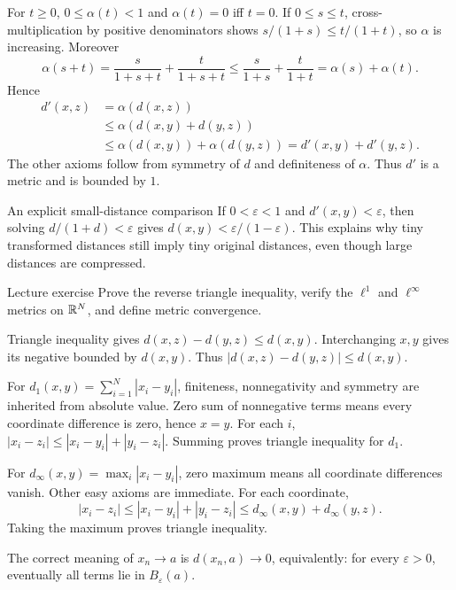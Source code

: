 \begin{answer}
For $t\ge0$, $0\le\alpha(t)<1$ and $\alpha(t)=0$ iff $t=0$. If $0\le s\le t$, cross-multiplication by positive denominators shows $s/(1+s)\le t/(1+t)$, so $\alpha$ is increasing. Moreover
\[\alpha(s+t)=\frac{s}{1+s+t}+\frac{t}{1+s+t}\le\frac{s}{1+s}+\frac{t}{1+t}=\alpha(s)+\alpha(t).\]
Hence
\begin{align*}
d'(x,z)&=\alpha(d(x,z))\\
&\le\alpha(d(x,y)+d(y,z))\\
&\le\alpha(d(x,y))+\alpha(d(y,z))=d'(x,y)+d'(y,z).
\end{align*}
The other axioms follow from symmetry of $d$ and definiteness of $\alpha$. Thus $d'$ is a metric and is bounded by $1$.
\end{answer}
\begin{note}{An explicit small-distance comparison}
If $0<\varepsilon<1$ and $d'(x,y)<\varepsilon$, then solving $d/(1+d)<\varepsilon$ gives $d(x,y)<\varepsilon/(1-\varepsilon)$. This explains why tiny transformed distances still imply tiny original distances, even though large distances are compressed.
\end{note}
\begin{exam}{Lecture exercise}
Prove the reverse triangle inequality, verify the $\ell^1$ and $\ell^\infty$ metrics on $\mathbb R^N$, and define metric convergence.
\end{exam}
\begin{answer}
Triangle inequality gives $d(x,z)-d(y,z)\le d(x,y)$. Interchanging $x,y$ gives its negative bounded by $d(x,y)$. Thus $|d(x,z)-d(y,z)|\le d(x,y)$.

For $d_1(x,y)=\sum_{i=1}^N|x_i-y_i|$, finiteness, nonnegativity and symmetry are inherited from absolute value. Zero sum of nonnegative terms means every coordinate difference is zero, hence $x=y$. For each $i$, $|x_i-z_i|\le|x_i-y_i|+|y_i-z_i|$. Summing proves triangle inequality for $d_1$.

For $d_\infty(x,y)=\max_i|x_i-y_i|$, zero maximum means all coordinate differences vanish. Other easy axioms are immediate. For each coordinate,
\[|x_i-z_i|\le|x_i-y_i|+|y_i-z_i|\le d_\infty(x,y)+d_\infty(y,z).\]
Taking the maximum proves triangle inequality.

The correct meaning of $x_n\to a$ is $d(x_n,a)\to0$, equivalently: for every $\varepsilon>0$, eventually all terms lie in $B_\varepsilon(a)$.
\end{answer}
